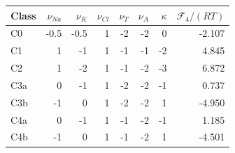 \begin{tabular}{lrrrrrrr}
\toprule
Class & $\nu_{Na}$ & $\nu_K$ & $\nu_{Cl}$ & $\nu_T$ & $\nu_A$ & $\kappa$ & $\mathcal F_4/(RT)$ \\
\midrule
C0 & -0.5 & -0.5 & 1 & -2 & -2 & 0 & -2.107 \\
C1 & 1 & -1 & 1 & -1 & -1 & -2 & 4.845 \\
C2 & 1 & -2 & 1 & -1 & -2 & -3 & 6.872 \\
C3a & 0 & -1 & 1 & -2 & -2 & -1 & 0.737 \\
C3b & -1 & 0 & 1 & -2 & -2 & 1 & -4.950 \\
C4a & 0 & -1 & 1 & -1 & -2 & -1 & 1.185 \\
C4b & -1 & 0 & 1 & -1 & -2 & 1 & -4.501 \\
\bottomrule
\end{tabular}
